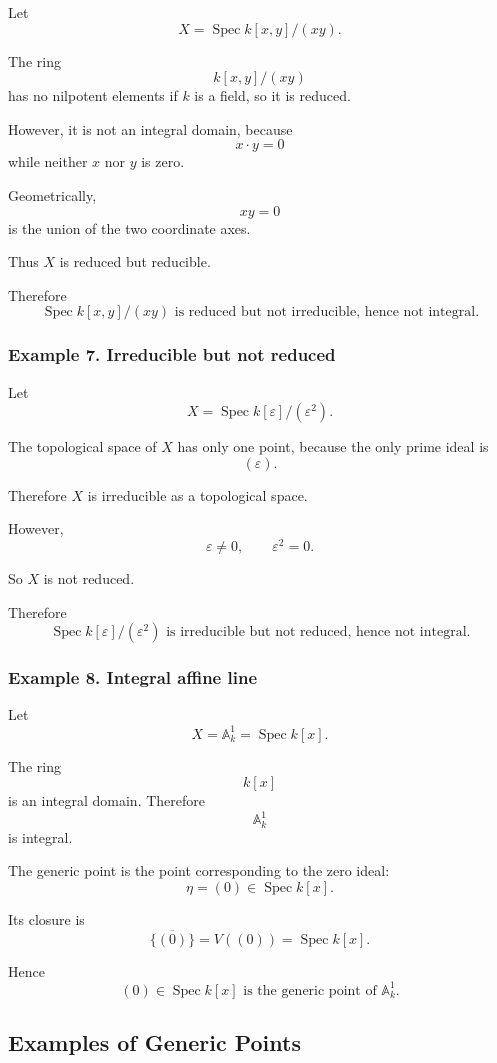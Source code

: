\documentclass[12pt,a4paper]{article}
\theoremstyle{notespace}
\begin{document}
Let
\[
X=\operatorname{Spec}k[x,y]/(xy).
\]

The ring
\[
k[x,y]/(xy)
\]
has no nilpotent elements if \(k\) is a field, so it is reduced.

However, it is not an integral domain, because
\[
x\cdot y=0
\]
while neither \(x\) nor \(y\) is zero.

Geometrically,
\[
xy=0
\]
is the union of the two coordinate axes.

Thus \(X\) is reduced but reducible.

Therefore
\[
\boxed{
	\operatorname{Spec}k[x,y]/(xy)
	\text{ is reduced but not irreducible, hence not integral.}
}
\]

\subsubsection*{Example 7. Irreducible but not reduced}

Let
\[
X=\operatorname{Spec}k[\varepsilon]/(\varepsilon^2).
\]

The topological space of \(X\) has only one point, because the only prime ideal is
\[
(\varepsilon).
\]

Therefore \(X\) is irreducible as a topological space.

However,
\[
\varepsilon\neq 0,
\qquad
\varepsilon^2=0.
\]

So \(X\) is not reduced.

Therefore
\[
\boxed{
	\operatorname{Spec}k[\varepsilon]/(\varepsilon^2)
	\text{ is irreducible but not reduced, hence not integral.}
}
\]

\subsubsection*{Example 8. Integral affine line}

Let
\[
X=\mathbb{A}^1_k=\operatorname{Spec}k[x].
\]

The ring
\[
k[x]
\]
is an integral domain. Therefore
\[
\mathbb{A}^1_k
\]
is integral.

The generic point is the point corresponding to the zero ideal:
\[
\eta=(0)\in \operatorname{Spec}k[x].
\]

Its closure is
\[
\overline{\{(0)\}}
=
V((0))
=
\operatorname{Spec}k[x].
\]

Hence
\[
\boxed{
	(0)\in \operatorname{Spec}k[x]
	\text{ is the generic point of } \mathbb{A}^1_k.
}
\]

\subsection{Examples of Generic Points}
\end{document}
